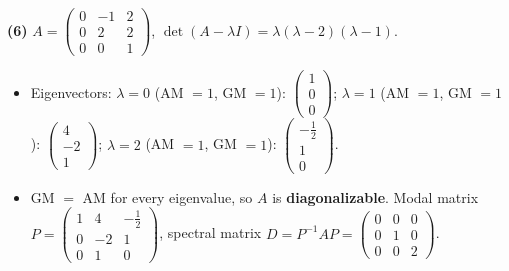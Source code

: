 \noindent\textbf{(6)} $A=\begin{pmatrix}0 & -1 & 2 \\ 0 & 2 & 2 \\ 0 & 0 & 1\end{pmatrix}$, $\det(A-\lambda I)=\lambda \left(\lambda - 2\right) \left(\lambda - 1\right)$.
\begin{itemize}\item Eigenvectors: $\lambda=0$ (AM $=1$, GM $=1$): $\begin{pmatrix}1 \\ 0 \\ 0\end{pmatrix}$; $\lambda=1$ (AM $=1$, GM $=1$): $\begin{pmatrix}4 \\ -2 \\ 1\end{pmatrix}$; $\lambda=2$ (AM $=1$, GM $=1$): $\begin{pmatrix}- \frac{1}{2} \\ 1 \\ 0\end{pmatrix}$.
\item GM $=$ AM for every eigenvalue, so $A$ is \textbf{diagonalizable}. Modal matrix $P=\begin{pmatrix}1 & 4 & - \frac{1}{2} \\ 0 & -2 & 1 \\ 0 & 1 & 0\end{pmatrix}$, spectral matrix $D=P^{-1}AP=\begin{pmatrix}0 & 0 & 0 \\ 0 & 1 & 0 \\ 0 & 0 & 2\end{pmatrix}$.\end{itemize}

